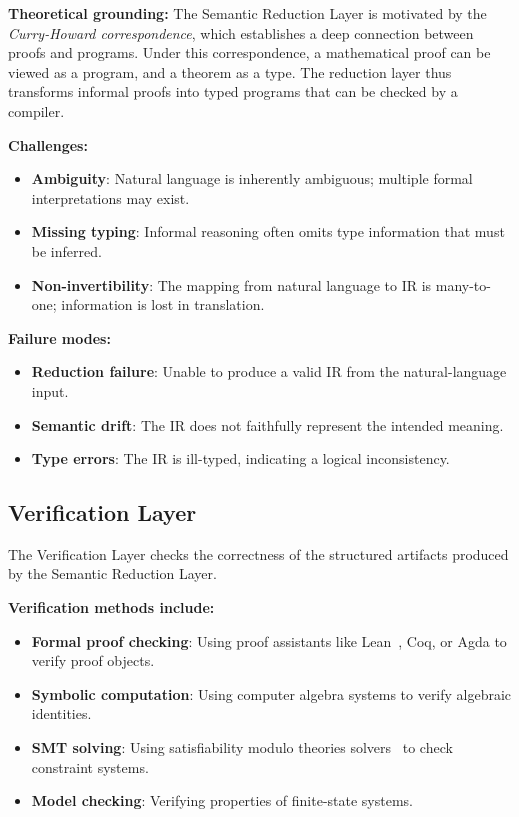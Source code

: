 \documentclass[11pt,a4paper]{article}
\begin{document}
\textbf{Theoretical grounding:} The Semantic Reduction Layer is motivated by the \emph{Curry-Howard correspondence}, which establishes a deep connection between proofs and programs. Under this correspondence, a mathematical proof can be viewed as a program, and a theorem as a type. The reduction layer thus transforms informal proofs into typed programs that can be checked by a compiler.

\textbf{Challenges:}
\begin{itemize}
  \item \textbf{Ambiguity}: Natural language is inherently ambiguous; multiple formal interpretations may exist.
  \item \textbf{Missing typing}: Informal reasoning often omits type information that must be inferred.
  \item \textbf{Non-invertibility}: The mapping from natural language to IR is many-to-one; information is lost in translation.
\end{itemize}

\textbf{Failure modes:}
\begin{itemize}
  \item \textbf{Reduction failure}: Unable to produce a valid IR from the natural-language input.
  \item \textbf{Semantic drift}: The IR does not faithfully represent the intended meaning.
  \item \textbf{Type errors}: The IR is ill-typed, indicating a logical inconsistency.
\end{itemize}

\subsection{Verification Layer}

The Verification Layer checks the correctness of the structured artifacts produced by the Semantic Reduction Layer.

\textbf{Verification methods include:}
\begin{itemize}
  \item \textbf{Formal proof checking}: Using proof assistants like Lean~\cite{avigad2014lean}, Coq, or Agda to verify proof objects.
  \item \textbf{Symbolic computation}: Using computer algebra systems to verify algebraic identities.
  \item \textbf{SMT solving}: Using satisfiability modulo theories solvers~\cite{de2008z3} to check constraint systems.
  \item \textbf{Model checking}: Verifying properties of finite-state systems.
\end{itemize}
\end{document}
